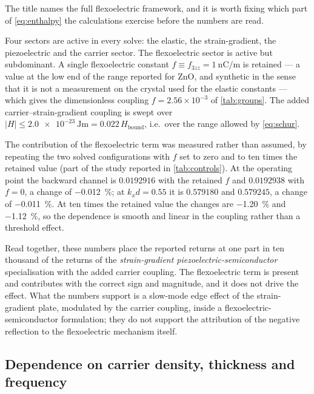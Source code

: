 The title names the full flexoelectric framework, and it is worth fixing which
part of \eqref{eq:enthalpy} the calculations exercise before the numbers are
read.

Four sectors are active in every solve: the elastic, the strain-gradient, the
piezoelectric and the carrier sector.  The flexoelectric sector is active but
subdominant.  A single flexoelectric constant $f\equiv f_{3zz}=\SI{1}{\nano
\coulomb\per\metre}$ is retained --- a value at the low end of the range
reported for ZnO, and synthetic in the sense that it is not a measurement on the
crystal used for the elastic constants --- which gives the dimensionless
coupling $f=2.56\times10^{-3}$ of \cref{tab:groups}.  The added
carrier--strain-gradient coupling is swept over
$|H|\le\SI{2.0e-23}{\joule\metre}=0.022\,H_{\text{bound}}$, i.e.\ over the
range allowed by \eqref{eq:schur}.

The contribution of the flexoelectric term was measured rather than assumed, by
repeating the two solved configurations with $f$ set to zero and to ten times
the retained value (part of the study reported in \cref{tab:controls}).  At the
operating point the backward
channel is $0.0192916$ with the retained $f$ and $0.0192938$ with $f=0$, a
change of \SI{-0.012}{\percent}; at $k_xd=0.55$ it is $0.579180$ and
$0.579245$, a change of \SI{-0.011}{\percent}.  At ten times the retained value the changes
are \SI{-1.20}{\percent} and \SI{-1.12}{\percent}, so the dependence is smooth
and linear in the coupling rather than a threshold effect.

Read together, these numbers place the reported returns at one part in ten
thousand of the returns of the \emph{strain-gradient
piezoelectric-semiconductor} specialisation with the added carrier coupling.
The flexoelectric term is present and contributes with the correct sign and
magnitude, and it does not drive the effect.  What the numbers support is a
slow-mode edge effect of the strain-gradient plate, modulated by the carrier
coupling, inside a flexoelectric-semiconductor formulation; they do not support
the attribution of the negative reflection to the flexoelectric mechanism
itself.

\subsection{Dependence on carrier density, thickness and frequency}
\label{sec:results_material}
\label{sec:results_geometry}
\label{sec:results_frequency}

